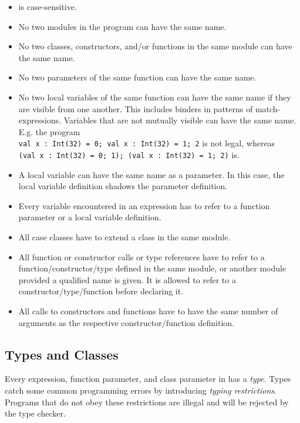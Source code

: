 \label{sec:names}
\begin{itemize}
    \item \langname is case-sensitive.
    \item No two modules in the program can have the same name.
    \item No two classes, constructors, and/or functions in the same module can have the same name.
    \item No two parameters of the same function can have the same name.
    \item No two local variables of the same function can have the same name if they are visible from
        one another.
        This includes binders in patterns of match-expressions.
        Variables that are not mutually visible can have the same name.
        E.g. the program \\
        \lstinline{val x : Int(32) = 0; val x : Int(32) = 1; 2} is not legal, whereas \\
        \lstinline{(val x : Int(32) = 0; 1); (val x : Int(32) = 1; 2)} is.
    \item A local variable can have the same name as a parameter. In this case, the local
        variable definition shadows the parameter definition.
    \item Every variable encountered in an expression
        has to refer to a function parameter or a local variable definition.
    \item All case classes have to extend a class in the same module.
    \item All function or constructor calls or type references have to refer to a function/constructor/type
        defined in the same module, or another module provided a qualified name is given.
        It is allowed to refer to a constructor/type/function before declaring it.
    \item All calls to constructors and functions have to have the same number of arguments
        as the respective constructor/function definition.
\end{itemize}

\subsection{Types and Classes}
\label{sec:classes}
Every expression, function parameter, and class parameter in \langname has a \emph{type}.
Types catch some common programming errors by introducing \emph{typing restrictions}.
Programs that do not obey these restrictions are illegal and will be rejected by
the \langname type checker.

